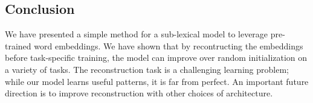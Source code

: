 \documentclass[11pt,letterpaper,UTF8]{article}
\begin{document}
\begin{CJK}{UTF8}{gbsn}
\section{Conclusion}
\label{sec:conclusion}

We have presented a simple method for a sub-lexical model to leverage pre-trained word embeddings.
We have shown that by recontructing the embeddings before task-specific training, the model can improve over random initialization on a variety of tasks.
The reconstruction task is a challenging learning problem; while our model learns useful patterns, it is far from perfect.
An important future direction is to improve reconstruction with other choices of architecture.





\clearpage\end{CJK}
\end{document}
